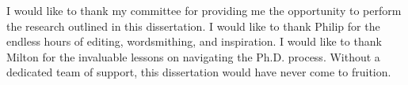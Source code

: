 \begin{acknowledgments}
    I would like to thank my committee for providing me the opportunity to perform the research outlined in this dissertation. I would like to thank Philip for the endless hours of editing, wordsmithing, and inspiration. I would like to thank Milton for the invaluable lessons on navigating the Ph.D. process. Without a dedicated team of support, this dissertation would have never come to fruition.
\end{acknowledgments}
